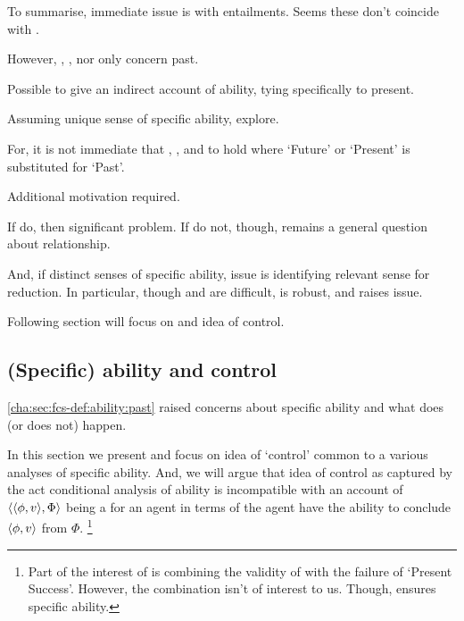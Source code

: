\begin{note}
  To summarise, immediate issue is with entailments.
  Seems these don't coincide with \fc{}.

  However, \BoyPS{}, \BoyPSC{}, nor \BoyPSCQC{} only concern past.

  Possible to give an indirect account of ability, tying specifically to present.

  Assuming unique sense of specific ability, explore.

  For, it is not immediate that \BoyPS{}, \BoyPSC{}, and \BoyPSCQC{} to hold where `Future' or `Present' is substituted for `Past'.

  Additional motivation required.

  If do, then significant problem.
  If do not, though, remains a general question about relationship.

  And, if distinct senses of specific ability, issue is identifying relevant sense for reduction.
  In particular, though \BoyPS{} and \BoyPSCQC{} are difficult, \BoyPSC{} is robust, and raises issue.

  Following section will focus on \BoyPS{} and idea of control.
\end{note}

\subsection{(Specific) ability and control}
\label{cha:sec:fcs-def:ability:control-intuition}

\begin{note}[Segue]
  \autoref{cha:sec:fcs-def:ability:past} raised concerns about specific ability and what does (or does not) happen.

  In this section we present and focus on idea of `control' common to a various analyses of specific ability.
  And, we will argue that idea of control as captured by the act conditional analysis of ability is incompatible with an account of \(\langle \langle \phi, v \rangle, \Phi \rangle\) being a  for an agent in terms of the agent have the ability to conclude \(\langle \phi, v \rangle\) from \(\Phi\).%
  \footnote{
    Part of the interest of \textcite{Boylan:2020aa} is combining the validity of \BoyPS{} with the failure of `Present Success'.
    However, the combination isn't of interest to us.
    Though, ensures specific ability.
  }
\end{note}

